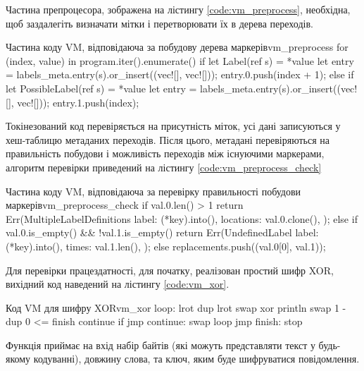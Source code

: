 \documentclass{lib/styles/default-style}
\begin{document}
    Частина препроцесора, зображена на лістингу \ref{code:vm_preprocess}, необхідна, щоб заздалегіть визначати мітки і перетворювати
    їх в дерева переходів.

    \begin{stdout}{Частина коду VM, відповідаюча за побудову дерева маркерів}{vm_preprocess}        
        for (index, value) in program.iter().enumerate() {
            if let Label(ref s) = *value {
                let entry = labels_meta.entry(s).or_insert((vec![], vec![]));
                entry.0.push(index + 1);
            } else if let PossibleLabel(ref s) = *value {
                let entry = labels_meta.entry(s).or_insert((vec![], vec![]));
                entry.1.push(index);
            }
        }\end{stdout}

    Токінезований код перевіряється на присутність міток, усі дані записуються у хеш-таблицю метаданих переходів.
    Після цього, метадані перевіряються на правильність побудови і можливість переходів між існуючими маркерами,
    алгоритм перевірки приведений на лістингу \ref{code:vm_preprocess_check}
    
    \begin{stdout}{Частина коду VM, відповідаюча за перевірку правильності побудови маркерів}{vm_preprocess_check}        
        if val.0.len() > 1 {
            return Err(MultipleLabelDefinitions {
                label: (*key).into(),
                locations: val.0.clone(),
            });
        } else if val.0.is_empty() && !val.1.is_empty() {
            return Err(UndefinedLabel {
                label: (*key).into(),
                times: val.1.len(),
            });
        } else
            replacements.push((val.0[0], val.1));\end{stdout}

    Для перевірки працездатності, для початку, реалізован простий шифр XOR, вихідний код наведений на лістингу \ref{code:vm_xor}.

    \begin{stdout}{Код VM для шифру XOR}{vm_xor}
    loop:
        lrot
        dup
        lrot
        swap
        xor
        println
        swap
        1 - 
        dup
        0
        <= finish continue if jmp
    continue:
        swap
        loop jmp
    finish:
        stop\end{stdout}
    
    Функція приймає на вхід набір байтів (які можуть представляти текст у будь-якому кодуванні), довжину слова, та ключ, яким буде
    шифруватися повідомлення.
    
\end{document}
